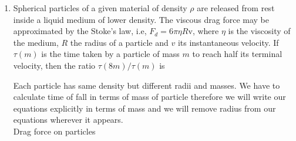 \begin{enumerate}
\begin{answer}
		The free body diagram is shown in figure.
	\begin{align*}
	\text{From figure: }R+F \sin \theta&=m g\\
	\text{At breaking off, }R&=0, \therefore F=\frac{m g}{\sin \theta}\\
\text{	Now }k t&=\frac{m g}{\sin \theta}\text{ or }t=\frac{m g}{k \sin \theta}
\intertext{	(a) If $a$ be the acceleration, then $F \cos \theta=m a$ }
\text{	Therefore, }k t \cos \theta&=m \times\left(\frac{d v}{d t}\right) \quad\left(\because a=\frac{d v}{d t}\right) .
\intertext{Integrating this expression within proper limits, we get $m \int_{0}^{v} d v=k \cos \theta \int_{0}^{m g / k \sin \theta} t d t$}
\text{ or }\quad m v&=\frac{k \cos \theta}{2}\left[\frac{m g}{k \sin \theta}\right]^{2}\text{ or }v=\frac{m g^{2}}{2 k}\left(\frac{\cos \theta}{\sin ^{2} \theta}\right)\\
\text{(b) Without putting the limits, we have }v&=\frac{k \cos \theta}{2 m} t^{2}+C,\text{ where $C=$ constant of integration.}\\
\text{When }t&=0, v=0\text{ and hence }C=0.\\
\text{Now, }\frac{d s}{d t}&=\frac{k \cos \theta}{2 m} t^{2} \int_{0}^{s} d s=\frac{k \cos \theta}{2 m} \int_{0}^{m g / k \sin \theta} t^{2} d t\\
s&=\frac{k \cos \theta}{2 m}\left[\frac{t^{3}}{3}\right]_{0}^{m g / k \sin \theta} \quad\text{ or }s=\frac{m^{2} g^{3} \cos \theta}{6 k^{2} \sin ^{3} \theta} .
	\end{align*}
\end{answer}
\item Spherical particles of a given material of density $\rho$ are released from rest inside a liquid medium of lower density. The viscous drag force may be approximated by the Stoke's law, i.e, $F_{d}=6 \pi \eta R \mathrm{v}$, where $\eta$ is the viscosity of the medium, $R$ the radius of a particle and $v$ its instantaneous velocity. If $\tau(m)$ is the time taken by a particle of mass $m$ to reach half its terminal velocity, then the ratio $\tau(8 m) / \tau(m)$ is
\begin{answer}
	 Each particle has same density but different radii and masses. We have to calculate time of fall in terms of mass of particle therefore we will write our equations explicitly in terms of mass and we will remove radius from our equations wherever it appears.\\Drag force on particles
	 \begin{align}

\end{align}
\end{answer}
\end{enumerate}
